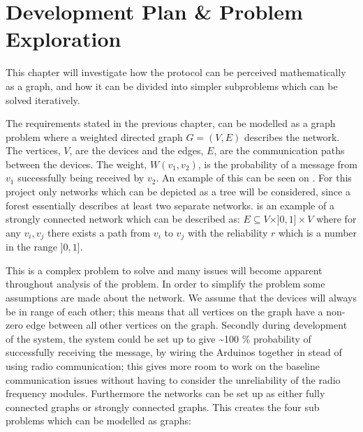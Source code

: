 \chapter{Development Plan \& Problem Exploration}\label{chp:Problems}
This chapter will investigate how the protocol can be perceived mathematically as a graph, and how it can be divided into simpler subproblems which can be solved iteratively.

The requirements stated in the previous chapter, can be modelled as a graph problem where a weighted directed graph $G = (V, E)$ describes the network. 
The vertices, $V$, are the devices and the edges, $E$, are the communication paths between the devices. 
The weight, $W(v_1, v_2)$, is the probability of a message from $v_1$ successfully being received by $v_2$.
An example of this can be seen on .
For this project only networks which can be depicted as a tree will be considered, since a forest essentially describes at least two separate networks.
 is an example of a strongly connected network which can be described as: $E \subseteq V \times ]0,1] \times V$ where for any $v_i, v_j$ there exists a path from $v_i$ to $v_j$ with the reliability $r$ which is a number in the range $]0,1]$.


\noindent This is a complex problem to solve and many issues will become apparent throughout analysis of the problem.
In order to simplify the problem some assumptions are made about the network.
We assume that the devices will always be in range of each other; this means that all vertices on the graph have a non-zero edge between all other vertices on the graph.
Secondly during development of the system, the system could be set up to give \textasciitilde100 \% probability of successfully receiving the message, by wiring the Arduinos together in stead of using radio communication; this gives more room to work on the baseline communication issues without having to consider the unreliability of the radio frequency modules.
Furthermore the networks can be set up as either fully connected graphs or strongly connected graphs.
This creates the four sub problems which can be modelled as graphs:  %


